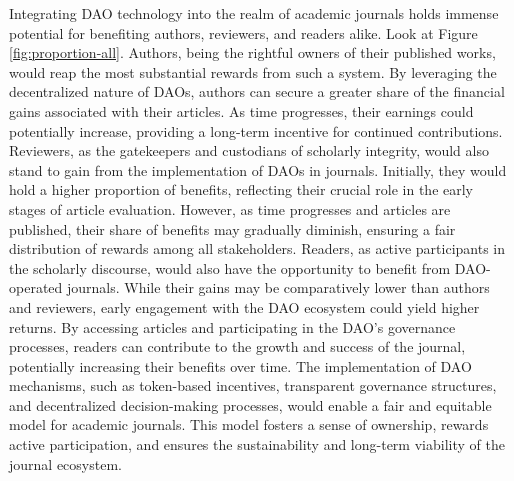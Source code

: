 \documentclass[lettersize,journal]{IEEEtran}
\begin{document}
Integrating DAO technology into the realm of academic journals holds immense potential for benefiting authors, reviewers, and readers alike. Look at Figure \ref{fig:proportion-all}.
Authors, being the rightful owners of their published works, would reap the most substantial rewards from such a system. By leveraging the decentralized nature of DAOs, authors can secure a greater share of the financial gains associated with their articles. As time progresses, their earnings could potentially increase, providing a long-term incentive for continued contributions.
Reviewers, as the gatekeepers and custodians of scholarly integrity, would also stand to gain from the implementation of DAOs in journals. Initially, they would hold a higher proportion of benefits, reflecting their crucial role in the early stages of article evaluation. However, as time progresses and articles are published, their share of benefits may gradually diminish, ensuring a fair distribution of rewards among all stakeholders.
Readers, as active participants in the scholarly discourse, would also have the opportunity to benefit from DAO-operated journals. While their gains may be comparatively lower than authors and reviewers, early engagement with the DAO ecosystem could yield higher returns. By accessing articles and participating in the DAO's governance processes, readers can contribute to the growth and success of the journal, potentially increasing their benefits over time.
The implementation of DAO mechanisms, such as token-based incentives, transparent governance structures, and decentralized decision-making processes, would enable a fair and equitable model for academic journals. This model fosters a sense of ownership, rewards active participation, and ensures the sustainability and long-term viability of the journal ecosystem.
\end{document}

